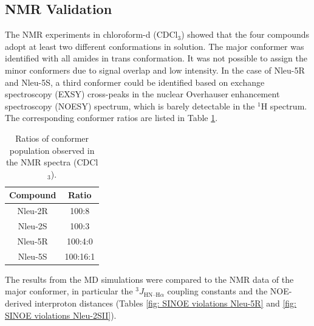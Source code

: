 \FloatBarrier

\subsection{NMR Validation}
The NMR experiments in chloroform-d (CDCl$_3$) showed that the four compounds adopt at least two different conformations in solution. \cite{Comeau2021}
The major conformer was identified with all amides in trans conformation. 
It was not possible to assign the minor conformers due to signal overlap and low intensity. In the case of Nleu-5R and Nleu-5S, a third conformer could be identified based on exchange spectroscopy (EXSY) cross-peaks in the nuclear Overhauser enhancement spectroscopy (NOESY) spectrum, which is barely detectable in the $^1$H spectrum. The corresponding conformer ratios are listed in Table \ref{tab: nmrConfRatios}.  

\begin{table}[h!]
    \centering
    \caption{Ratios of conformer population observed in the NMR spectra (CDCl$_3$).}
    \label{tab: nmrConfRatios}
    \begin{adjustbox}{max width=\textwidth}
    \begin{tabular}{cc}
    Compound & Ratio \\
    \hline
    Nleu-2R &	100:8 \\
    Nleu-2S &   100:3 \\
    Nleu-5R &   100:4:0 \\
    Nleu-5S &	100:16:1 \\
    \hline
    \end{tabular}
    \end{adjustbox}
\end{table}

The results from the MD simulations were compared to the NMR data of the major conformer, in particular the $^3J_{\text{HN–H}\alpha}$ coupling constants and the NOE-derived interproton distances (Tables \ref{fig: SINOE violations Nleu-5R} and \ref{fig: SINOE violations Nleu-2SII}).

